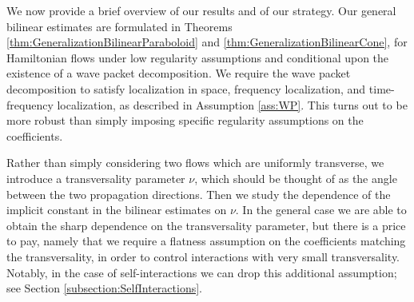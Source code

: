 \documentclass{amsart}
\theoremstyle{definition}
\begin{document}
\smallskip

We now provide a brief overview of our results and of our strategy. Our general bilinear estimates are formulated in Theorems \ref{thm:GeneralizationBilinearParaboloid} and \ref{thm:GeneralizationBilinearCone}, for Hamiltonian flows under low regularity assumptions and conditional upon the existence of a wave packet decomposition. We require the wave packet decomposition to satisfy localization in space, frequency localization, and time-frequency localization,
as described in Assumption \ref{ass:WP}.
This turns out to be more robust than simply imposing specific regularity assumptions on the coefficients.

Rather than simply considering two flows
which are uniformly transverse, we introduce a transversality parameter $\nu$, which should be thought of as the angle between the two propagation directions. Then we study the dependence 
of the implicit constant in the bilinear
estimates on $\nu$.
In the general case we are able to  obtain the sharp dependence on the transversality parameter, but there 
is a price to pay, namely that we  require a flatness assumption on the coefficients matching the transversality, in order to control interactions with very small transversality. Notably, in the case of self-interactions we can drop this additional assumption; see Section \ref{subsection:SelfInteractions}.

\smallskip
\end{document}
